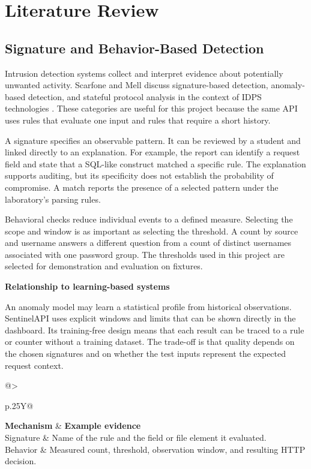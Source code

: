 \documentclass[11pt,letterpaper,oneside]{report}
\makeatletter
\newcommand{\topic}[1]{\smallskip\noindent\textbf{#1}\par\nobreak\vspace{-.39em}}
\newcommand{\tabletitle}[1]{\captionof{table}{#1}\smallskip}
\newcommand{\bodytable}[1]{\begin{tabularx}{\linewidth}{@{}>{\raggedright\arraybackslash}p{.25\linewidth}Y@{}}\toprule #1\bottomrule\end{tabularx}}
\makeatother
\begin{document}
\chapter{Literature Review}
\section{Signature and Behavior-Based Detection}
Intrusion detection systems collect and interpret evidence about potentially unwanted activity. Scarfone and Mell discuss signature-based detection, anomaly-based detection, and stateful protocol analysis in the context of IDPS technologies \cite{nist}. These categories are useful for this project because the same API uses rules that evaluate one input and rules that require a short history.

A signature specifies an observable pattern. It can be reviewed by a student and linked directly to an explanation. For example, the report can identify a request field and state that a SQL-like construct matched a specific rule. The explanation supports auditing, but its specificity does not establish the probability of compromise. A match reports the presence of a selected pattern under the laboratory's parsing rules.

Behavioral checks reduce individual events to a defined measure. Selecting the scope and window is as important as selecting the threshold. A count by source and username answers a different question from a count of distinct usernames associated with one password group. The thresholds used in this project are selected for demonstration and evaluation on fixtures.

\topic{Relationship to learning-based systems}
An anomaly model may learn a statistical profile from historical observations. SentinelAPI uses explicit windows and limits that can be shown directly in the dashboard. Its training-free design means that each result can be traced to a rule or counter without a training dataset. The trade-off is that quality depends on the chosen signatures and on whether the test inputs represent the expected request context.

\tabletitle{Two sources of detection evidence}
\bodytable{\textbf{Mechanism} & \textbf{Example evidence}\\\midrule
Signature & Name of the rule and the field or file element it evaluated.\\
Behavior & Measured count, threshold, observation window, and resulting HTTP decision.\\}
\end{document}
